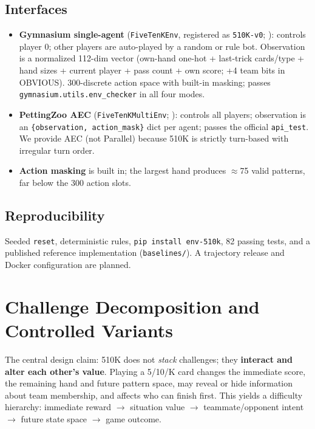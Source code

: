 \documentclass{article}
\begin{document}
\subsection{Interfaces}
\begin{itemize}
\item \textbf{Gymnasium single-agent} (\texttt{FiveTenKEnv}, registered as
\texttt{510K-v0}; \citealp{gymnasium}): controls player 0; other players are
auto-played by a random or rule bot. Observation is a normalized 112-dim vector
(own-hand one-hot + last-trick cards/type + hand sizes + current player + pass
count + own score; +4 team bits in OBVIOUS). 300-discrete action space with
built-in masking; passes \texttt{gymnasium.utils.env\_checker} in all four
modes.
\item \textbf{PettingZoo AEC} (\texttt{FiveTenKMultiEnv}; \citealp{pz}):
controls all players; observation is an \texttt{\{observation, action\_mask\}}
dict per agent; passes the official \texttt{api\_test}. We provide AEC (not
Parallel) because 510K is strictly turn-based with irregular turn order.
\item \textbf{Action masking} is built in; the largest hand produces
$\approx$75 valid patterns, far below the 300 action slots.
\end{itemize}

\subsection{Reproducibility}
Seeded \texttt{reset}, deterministic rules, \texttt{pip install env-510k}, 82
passing tests, and a published reference implementation (\texttt{baselines/}).
A trajectory release and Docker configuration are planned.

\section{Challenge Decomposition and Controlled Variants}
The central design claim: 510K does not \emph{stack} challenges; they
\textbf{interact and alter each other's value}. Playing a 5/10/K card changes
the immediate score, the remaining hand and future pattern space, may reveal or
hide information about team membership, and affects who can finish first. This
yields a difficulty hierarchy: immediate reward $\to$ situation value $\to$
teammate/opponent intent $\to$ future state space $\to$ game outcome.
\end{document}
